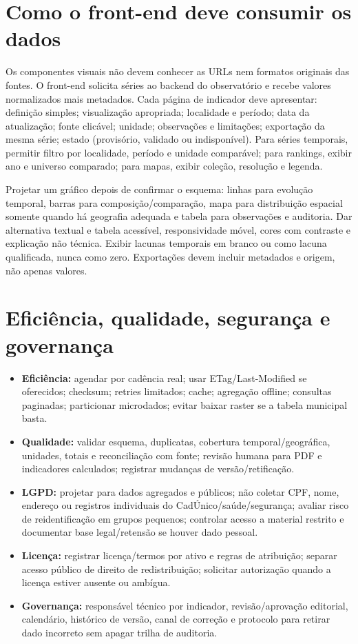 \documentclass[12pt]{article}
\begin{document}
\section{Como o front-end deve consumir os dados}
Os componentes visuais não devem conhecer as URLs nem formatos originais das fontes. O front-end solicita séries ao backend do observatório e recebe valores normalizados mais metadados. Cada página de indicador deve apresentar: definição simples; visualização apropriada; localidade e período; data da atualização; fonte clicável; unidade; observações e limitações; exportação da mesma série; estado (provisório, validado ou indisponível). Para séries temporais, permitir filtro por localidade, período e unidade comparável; para rankings, exibir ano e universo comparado; para mapas, exibir coleção, resolução e legenda.

Projetar um gráfico depois de confirmar o esquema: linhas para evolução temporal, barras para composição/comparação, mapa para distribuição espacial somente quando há geografia adequada e tabela para observações e auditoria. Dar alternativa textual e tabela acessível, responsividade móvel, cores com contraste e explicação não técnica. Exibir lacunas temporais em branco ou como lacuna qualificada, nunca como zero. Exportações devem incluir metadados e origem, não apenas valores.

\section{Eficiência, qualidade, segurança e governança}
\begin{itemize}
  \item \textbf{Eficiência:} agendar por cadência real; usar ETag/Last-Modified se oferecidos; checksum; retries limitados; cache; agregação offline; consultas paginadas; particionar microdados; evitar baixar raster se a tabela municipal basta.
  \item \textbf{Qualidade:} validar esquema, duplicatas, cobertura temporal/geográfica, unidades, totais e reconciliação com fonte; revisão humana para PDF e indicadores calculados; registrar mudanças de versão/retificação.
  \item \textbf{LGPD:} projetar para dados agregados e públicos; não coletar CPF, nome, endereço ou registros individuais do CadÚnico/saúde/segurança; avaliar risco de reidentificação em grupos pequenos; controlar acesso a material restrito e documentar base legal/retensão se houver dado pessoal.
  \item \textbf{Licença:} registrar licença/termos por ativo e regras de atribuição; separar acesso público de direito de redistribuição; solicitar autorização quando a licença estiver ausente ou ambígua.
  \item \textbf{Governança:} responsável técnico por indicador, revisão/aprovação editorial, calendário, histórico de versão, canal de correção e protocolo para retirar dado incorreto sem apagar trilha de auditoria.
\end{itemize}
\end{document}
